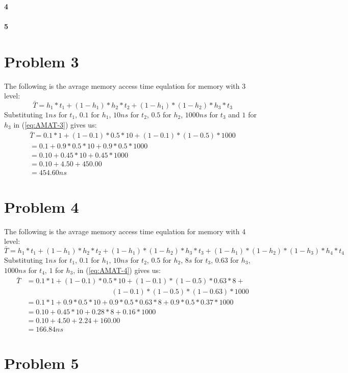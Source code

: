 \documentclass[11pt]{article}
\begin{document}
\paragraph{4}
\paragraph{5}
\section{Problem 3}
The following is the avrage memory access time equlation for
memory with 3 level:
\begin{equation}
	\label{eq:AMAT-3}
	\bar{T} = h_1 * t_1 + (1 - h_1) * h_2 * t_2 + (1 - h_1) * (1 - h_2) * h_3 * t_3
\end{equation}
Substituting $1ns$ for $t_1$, $0.1$ for $h_1$, $10ns$ for $t_2$, $0.5$ for $h_2$, $1000ns$ for $t_3$ and $1$ for $h_3$
in (\ref{eq:AMAT-3}) gives us:
\begin{align*}
	\bar{T} = 0.1 * 1 + (1 - 0.1) * 0.5 * 10 + (1 - 0.1) * (1 - 0.5) * 1000\\
	= 0.1 + 0.9 * 0.5 * 10 + 0.9 * 0.5 * 1000\\
	= 0.10 + 0.45 * 10 + 0.45 * 1000\\
	= 0.10 + 4.50 + 450.00\\
	= 454.60ns
\end{align*}
\section{Problem 4}
The following is the avrage memory access time equlation for
memory with 4 level:
\begin{equation}
	\label{eq:AMAT-4}
	\bar{T} = h_1 * t_1 + (1 - h_1) * h_2 * t_2 + (1 - h_1) * (1 - h_2) * h_3 * t_3 + (1 - h_1) * (1 - h_2) * (1 - h_3) * h_4 * t_4
\end{equation}
Substituting $1ns$ for $t_1$, $0.1$ for $h_1$, $10ns$ for $t_2$, $0.5$ for $h_2$, $8s$ for $t_3$, $0.63$ for $h_3$,$1000ns$ for $t_4$, $1$ for $h_3$,
in (\ref{eq:AMAT-4}) gives us:
\begin{align*}
	\bar{T} &= 0.1 * 1 + (1 - 0.1) * 0.5 * 10 + (1 - 0.1) * (1 - 0.5) * 0.63 * 8 + \\
	&\qquad \phantom{= 0.1 * 1 + (1 - 0.1)} (1 - 0.1) * (1 - 0.5) * (1 - 0.63) * 1000 \\
	&= 0.1 * 1 + 0.9 * 0.5 * 10 + 0.9 * 0.5 * 0.63 * 8 + 0.9 * 0.5 * 0.37 * 1000 \\
	&= 0.10 + 0.45 * 10 + 0.28 * 8 + 0.16 * 1000 \\
	&= 0.10 + 4.50 + 2.24 + 160.00 \\
	&= 166.84ns
\end{align*}
\section{Problem 5}
\end{document}

